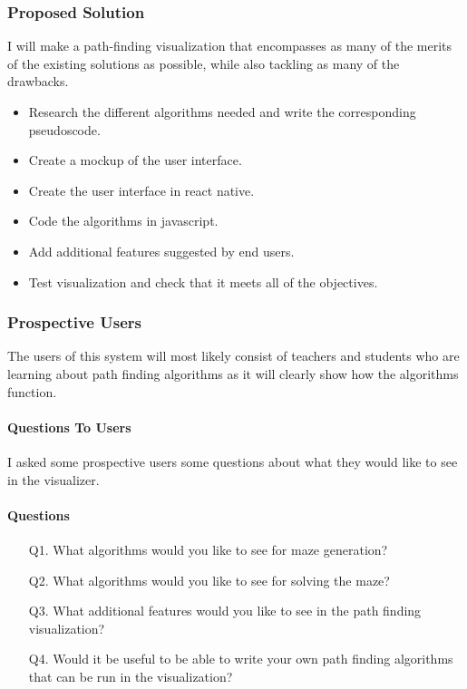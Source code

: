 \documentclass{article}
\begin{document}
\subsubsection{Proposed Solution}
I will make a path-finding visualization that encompasses as many of the merits of the existing solutions as possible, while also tackling as many of the drawbacks.
\begin{itemize}
    \item Research the different algorithms needed and write the corresponding pseudoscode.
    \item Create a mockup of the user interface.
    \item Create the user interface in react native.
    \item Code the algorithms in javascript.
    \item Add additional features suggested by end users.
    \item Test visualization and check that it meets all of the objectives.
\end{itemize}
\subsubsection{Prospective Users}
The users of this system will most likely consist of teachers and students who are learning about path finding algorithms as it will clearly show how the algorithms function.
\paragraph{Questions To Users}
I asked some prospective users some questions about what they would like to see in the visualizer.
\paragraph*{Questions}
\begin{enumerate}
    \item[Q1.]What algorithms would you like to see for maze generation?
    \item[Q2.]What algorithms would you like to see for solving the maze?
    \item[Q3.]What additional features would you like to see in the path finding visualization?
    \item[Q4.]Would it be useful to be able to write your own path finding algorithms that can be run in the visualization?  
\end{enumerate}
\end{document}
